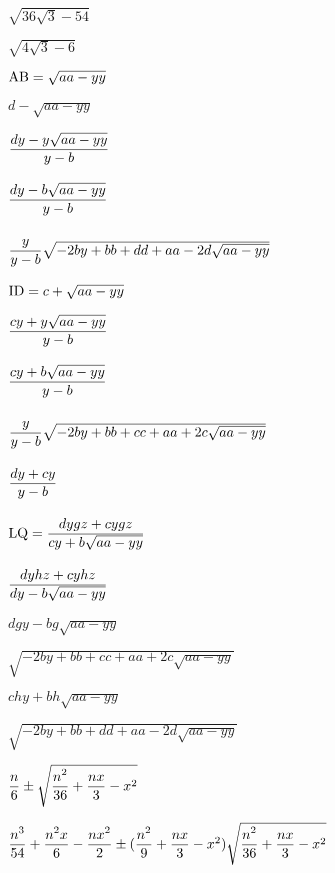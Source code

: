 $\sqrt{36\sqrt{3} - 54}$\par\vfill\eject
$\sqrt{4\sqrt{3} - 6}$\par\vfill\eject
${\rm AB} = \sqrt{aa - yy}$\par\vfill\eject
$d - \sqrt{aa - yy}$\par\vfill\eject
${\displaystyle\strut {dy - y\sqrt{aa - yy}}\over \displaystyle\strut {y - b}}$\par\vfill\eject
${\displaystyle\strut {dy - b\sqrt{aa - yy}}\over \displaystyle\strut {y - b}}$\par\vfill\eject
${\displaystyle\strut {y}\over \displaystyle\strut {y - b}}\sqrt{ - 2by + bb + dd + aa - 2d\sqrt{aa - yy}}$\par\vfill\eject
${\rm ID} = c + \sqrt{aa - yy}$\par\vfill\eject
${\displaystyle\strut {cy + y\sqrt{aa - yy}}\over \displaystyle\strut {y - b}}$\par\vfill\eject
${\displaystyle\strut {cy + b\sqrt{aa - yy}}\over \displaystyle\strut {y - b}}$\par\vfill\eject
${\displaystyle\strut {y}\over \displaystyle\strut {y - b}}\sqrt{ - 2by + bb + cc + aa + 2c\sqrt{aa - yy}}$\par\vfill\eject
${\displaystyle\strut {dy + cy}\over \displaystyle\strut {y - b}}$\par\vfill\eject
${\rm LQ} = {\displaystyle\strut {dygz + cygz}\over \displaystyle\strut {cy + b\sqrt{aa - yy}}}$\par\vfill\eject
${\displaystyle\strut {dyhz + cyhz}\over \displaystyle\strut {dy - b\sqrt{aa - yy}}}$\par\vfill\eject
$dgy - bg\sqrt{aa - yy}$\par\vfill\eject
$\sqrt{ - 2by + bb + cc + aa + 2c\sqrt{aa - yy}}$\par\vfill\eject
$chy + bh\sqrt{aa - yy}$\par\vfill\eject
$\sqrt{ - 2by + bb + dd + aa - 2d\sqrt{aa - yy}}$\par\vfill\eject
${\displaystyle\strut n\over \displaystyle\strut 6} \pm  \sqrt{{\displaystyle\strut n^{2}\over \displaystyle\strut 36} + {\displaystyle\strut {nx}\over \displaystyle\strut 3} - x^{2}}$\par\vfill\eject
${\displaystyle\strut n^{3}\over \displaystyle\strut 54} + {\displaystyle\strut {n^{2}x}\over \displaystyle\strut 6} - {\displaystyle\strut {nx^{2}}\over \displaystyle\strut 2} \pm  ({\displaystyle\strut n^{2}\over \displaystyle\strut 9} + {\displaystyle\strut {nx}\over \displaystyle\strut 3} - x^{2})\sqrt{{\displaystyle\strut {n^{2}}\over \displaystyle\strut 36} + {\displaystyle\strut {nx}\over \displaystyle\strut 3} - x^{2}}$\par\vfill\eject

